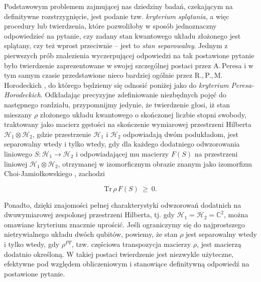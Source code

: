 Podstawowym problemem zajmującej nas dziedziny badań,
czekającym na definitywne rozstrzygnięcie,
jest podanie tzw. \emph{kryterium splątania},
a więc procedury lub twierdzenia,
które pozwoliłoby w sposób jednoznaczny odpowiedzieć na pytanie,
czy zadany stan kwantowego układu złożonego jest splątany,
czy też wprost przeciwnie -- jest to
 \emph{stan separowalny}.
Jednym z pierwszych prób znalezienia wyczerpującej odpowiedzi na tak postawione
pytanie było twierdzenie zaprezentowane w swojej szczególnej postaci
przez A.\,Peresa
\cite{peres1996separability}
i w tym samym czasie przedstawione nieco bardziej ogólnie przez
R.,\,P.,\,M.\,Horodeckich
\cite{horodecki1996separability},
do którego będziemy się odnosić poniżej jako do
 \emph{kryterium Peresa-Horodeckich}.
Odkładając precyzyjne zdefiniowanie niezbędnych pojęć do następnego rozdziału,
przypomnijmy jedynie, że twierdzenie głosi,
iż stan mieszany $\rho$ złożonego układu kwantowego o skończonej liczbie
stopni swobody,
traktowany jako macierz gęstości na skończenie wymiarowej przestrzeni
Hilberta $\mathcal{H}_{1} \! \otimes \! \mathcal{H}_{2}$,
gdzie przestrzenie $\mathcal{H}_{1}$ i $\mathcal{H}_{2}$ odpowiadają dwóm podukładom,
jest separowalny wtedy i tylko wtedy,
gdy dla każdego dodatniego odwzorowania liniowego
$S \!: \mathcal{H}_{1} \rightarrow \mathcal{H}_{2}$
i odpowiadającej mu macierzy $F(S)$ na przestrzeni liniowej
$\mathcal{H}_{1} \! \otimes \! \mathcal{H}_{2}$,
otrzymanej w izomorficznym obrazie znanym jako izomorfizm Choi-Jamiołkowskiego
\cite{choi1975completely, jamiolkowski1972linear},
zachodzi
\begin{linenomath*}
 \begin{equation}
    \nonumber
    \label{eq:PHcriterionOrig}
    \text{Tr} \, \rho \, F(S) \: \geq \: 0.
 \end{equation}
\end{linenomath*}
Ponadto, dzięki znajomości pełnej charakterystyki odwzorowań dodatnich
na dwuwymiarowej zespolonej przestrzeni Hilberta,
tj. gdy $\mathcal{H}_{1} = \mathcal{H}_{2} = \mathbb{C}^{2}$,
można omawiane kryterium znacznie uprościć.
Jeśli ograniczymy się do najprostszego nietrywialnego układu dwóch qubitów,
powiemy,
że stan $\rho$ jest separowalny wtedy i tylko wtedy,
gdy $\rho^{PT}$, tzw. częściowa transpozycja macierzy $\rho$,
jest macierzą dodatnio określoną.
W takiej postaci twierdzenie jest niezwykle użyteczne, efektywne pod względem
obliczeniowym i stanowiące definitywną odpowiedź na postawione pytanie.
